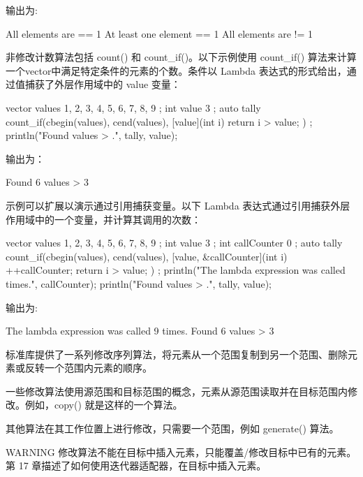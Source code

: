 输出为:

\begin{shell}
All elements are == 1
At least one element == 1
All elements are != 1
\end{shell}


非修改计数算法包括 count() 和 count\_if()。以下示例使用 count\_if() 算法来计算一个vector中满足特定条件的元素的个数。条件以 Lambda 表达式的形式给出，通过值捕获了外层作用域中的 value 变量：

\begin{cpp}
vector values { 1, 2, 3, 4, 5, 6, 7, 8, 9 };
int value { 3 };
auto tally { count_if(cbegin(values), cend(values),
    [value](int i){ return i > value; }) };
println("Found {} values > {}.", tally, value);
\end{cpp}

输出为：

\begin{shell}
Found 6 values > 3
\end{shell}

示例可以扩展以演示通过引用捕获变量。以下 Lambda 表达式通过引用捕获外层作用域中的一个变量，并计算其调用的次数：

\begin{cpp}
vector values { 1, 2, 3, 4, 5, 6, 7, 8, 9 };
int value { 3 };
int callCounter { 0 };
auto tally { count_if(cbegin(values), cend(values),
    [value, &callCounter](int i){ ++callCounter; return i > value; }) };
println("The lambda expression was called {} times.", callCounter);
println("Found {} values > {}.", tally, value);
\end{cpp}

输出为:

\begin{shell}
The lambda expression was called 9 times.
Found 6 values > 3
\end{shell}


标准库提供了一系列修改序列算法，将元素从一个范围复制到另一个范围、删除元素或反转一个范围内元素的顺序。

一些修改算法使用源范围和目标范围的概念，元素从源范围读取并在目标范围内修改。例如，copy() 就是这样的一个算法。

其他算法在其工作位置上进行修改，只需要一个范围，例如 generate() 算法。

\begin{myWarning}{WARNING}
修改算法不能在目标中插入元素，只能覆盖/修改目标中已有的元素。第 17 章描述了如何使用迭代器适配器，在目标中插入元素。
\end{myWarning}


